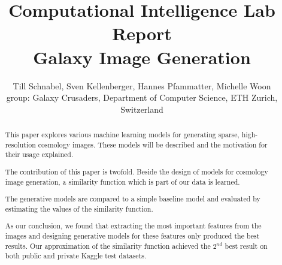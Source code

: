 \documentclass[10pt,conference,compsocconf]{IEEEtran}
\newcommand\TODO[1]{\textcolor{red}{#1}} %
\begin{document}
\title{Computational Intelligence Lab Report\\ {\large Galaxy Image Generation}}

\author{Till Schnabel, Sven Kellenberger, Hannes Pfammatter, Michelle Woon \\group: Galaxy Crusaders, Department of Computer Science, ETH Zurich, Switzerland}

\maketitle

\begin{abstract}
This paper explores various machine learning models for generating sparse, high-resolution cosmology images. These models will be described and the motivation for their usage explained.

The contribution of this paper is twofold. Beside the design of models for cosmology image generation, a similarity function which is part of our data is learned. 

The generative models are compared to a simple baseline model and evaluated by estimating the values of the similarity function.

As our conclusion, we found that extracting the most important features from the images and designing generative models for these features only produced the best results. Our approximation of the similarity function achieved the $2^{nd}$ best result on both public and private Kaggle test datasets.




\end{abstract}
\end{document}
